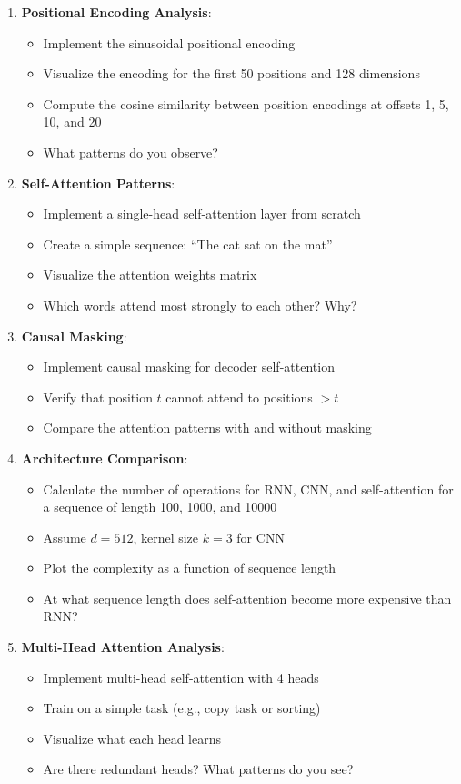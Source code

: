 \documentclass{article}
\begin{document}
\begin{enumerate}
\item \textbf{Positional Encoding Analysis}:
\begin{itemize}
\item Implement the sinusoidal positional encoding
\item Visualize the encoding for the first 50 positions and 128 dimensions
\item Compute the cosine similarity between position encodings at offsets 1, 5, 10, and 20
\item What patterns do you observe?
\end{itemize}

\item \textbf{Self-Attention Patterns}:
\begin{itemize}
\item Implement a single-head self-attention layer from scratch
\item Create a simple sequence: ``The cat sat on the mat''
\item Visualize the attention weights matrix
\item Which words attend most strongly to each other? Why?
\end{itemize}

\item \textbf{Causal Masking}:
\begin{itemize}
\item Implement causal masking for decoder self-attention
\item Verify that position $t$ cannot attend to positions $> t$
\item Compare the attention patterns with and without masking
\end{itemize}

\item \textbf{Architecture Comparison}:
\begin{itemize}
\item Calculate the number of operations for RNN, CNN, and self-attention for a sequence of length 100, 1000, and 10000
\item Assume $d = 512$, kernel size $k = 3$ for CNN
\item Plot the complexity as a function of sequence length
\item At what sequence length does self-attention become more expensive than RNN?
\end{itemize}

\item \textbf{Multi-Head Attention Analysis}:
\begin{itemize}
\item Implement multi-head self-attention with 4 heads
\item Train on a simple task (e.g., copy task or sorting)
\item Visualize what each head learns
\item Are there redundant heads? What patterns do you see?
\end{itemize}


\end{enumerate}
\end{document}

